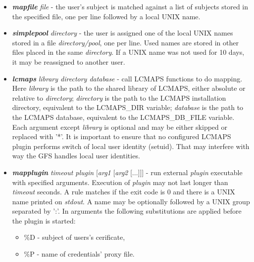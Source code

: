 \documentclass{article}
\begin{document}
\begin{itemize}
\begin{itemize}
\item \textbf{\textit{mapfile}} \textit{file} - the user's subject is
  matched against a list of subjects stored in the specified file, one
  per line followed by a local UNIX name.
\item \textbf{\textit{simplepool}} \textit{directory} - the user is
  assigned one of the local UNIX names stored in a file
  \textit{directory/pool}, one per line. Used names are stored in
  other files placed in the same \textit{directory}. If a UNIX name
  was not used for 10 days, it may be reassigned to another user.
\item \textbf{\textit{lcmaps}} \textit{library directory database} -
  call LCMAPS functions to do mapping. Here \textit{library} is the
  path to the shared library of LCMAPS, either absolute or relative to
  \textit{directory}; \textit{directory} is the path to the LCMAPS
  installation directory, equivalent to the LCMAPS\_DIR variable;
  \textit{database} is the path to the LCMAPS database, equivalent to
  the LCMAPS\_DB\_FILE variable. Each argument except \textit{library}
  is optional and may be either skipped or replaced with '{*}'. It is
  important to ensure that no configured LCMAPS plugin performs switch
  of local user identity (setuid). That may interfere with way the GFS
  handles local user identities.
\item \textbf{\textit{mapplugin}} \textit{timeout plugin}
  {[}\textit{arg1} {[}\textit{arg2} {[}...]]] - run external
  \emph{plugin} executable with specified arguments. Execution of
  \emph{plugin} may not last longer than \emph{timeout} seconds. A
  rule matches if the exit code is 0 and there is a UNIX name printed
  on \emph{stdout}. A name may be optionally followed by a UNIX group
  separated by ':'. In arguments the following substitutions are
  applied before the plugin is started:

\begin{itemize}
\item \%D - subject of users's cerificate,
\item \%P - name of credentials' proxy file.
\end{itemize}

\end{itemize}


\end{itemize}
\end{document}

